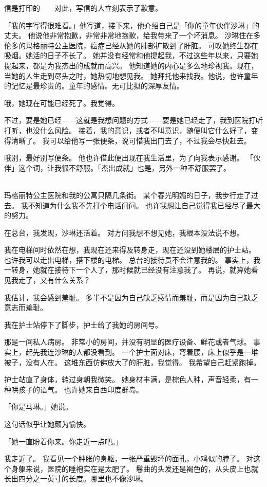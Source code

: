 \documentclass[UTF8]{ctexart}
\begin{document}
信是打印的——对此，写信的人立刻表示了歉意。

「我的字写得很难看。」他写道，接下来，他介绍自己是「你的童年伙伴沙琳」的丈夫。
他说他非常抱歉，非常非常地抱歉，给我带来了一个坏消息。
沙琳住在多伦多的玛格丽特公主医院，癌症已经从她的肺部扩散到了肝脏。
可叹她终生都在吸烟。她活的日子不长了。
她并没有经常和他提起我，不过这些年以来，只要她提起来，都是为我杰出的成就而高兴。
他知道她的内心是多么地珍视我。现在，当她的人生走到尽头之时，她热切地想见我。
她拜托他来找我。他说，也许童年的记忆是最珍贵的。童年的感情。无可比拟的深厚友情。

哦，她现在可能已经死了。我觉得。

不过，要是她已经——这就是我想问题的方式——要是她已经走了，我到医院打听打听，也没什么风险。
接着，我的意识，或者不叫意识，随便叫它什么好了，变得清晰了。
我可以给他写一张便条，说可惜我出门去了，不过我会尽快赶去。

哦别，最好别写便条。
他也许借此便出现在我生活里，为了向我表示感谢。
「伙伴」这个词，让我很不舒服。「杰出成就」也是，另外一种不舒服罢了。

~\\

玛格丽特公主医院和我的公寓只隔几条街。
某个春光明媚的日子，我步行走了过去。
我不知道为什么我不先打个电话问问。
也许我想让自己觉得我已经尽了最大的努力。

在总台，我发现，沙琳还活着。
对方问我想不想见她，我根本没法说不想。

我在电梯间时依然在想，我现在还来得及转身走，现在还没到她楼层的护士站。
也许我可以走出电梯，搭下楼的电梯。
总台的接待员不会注意我的。
事实上，我一转身，她就在接待下一个人了，那时候就已经没有注意我了。
再说，就算她看见我走了，又有什么关系？

我估计，我会感到羞耻。
多半不是因为自己缺乏感情而羞耻，而是因为自己缺乏意志而羞耻。

我在护士站停下了脚步，护士给了我她的房间号。

那是一间私人病房。
非常小的房间，并没有明显的医疗设备、鲜花或者气球。
事实上，起先我连沙琳的人都没看到。
一个护士面对床，弯着腰，床上似乎是一堆被子，没有人在。
这堆东西仿佛放大了的肝脏，我觉得。
我希望自己赶紧跑掉。

护士站直了身体，转过身朝我微笑。
她身材丰满，是棕色人种，声音轻柔，有一种哄孩子的语气。
也许她来自西印度群岛。

「你是马琳。」她说。

这句话似乎让她颇为愉快。

「她一直盼着你来。你走近一点吧。」

我走近了。
我看见一个肿胀的身躯，一张严重毁坏的面孔，小鸡似的脖子。
对这个身躯来说，医院的睡袍实在是太肥了。
鬈曲的头发还是褐色的，从头皮上也就长出四分之一英寸的长度。哪里也不像沙琳。
\end{document}
